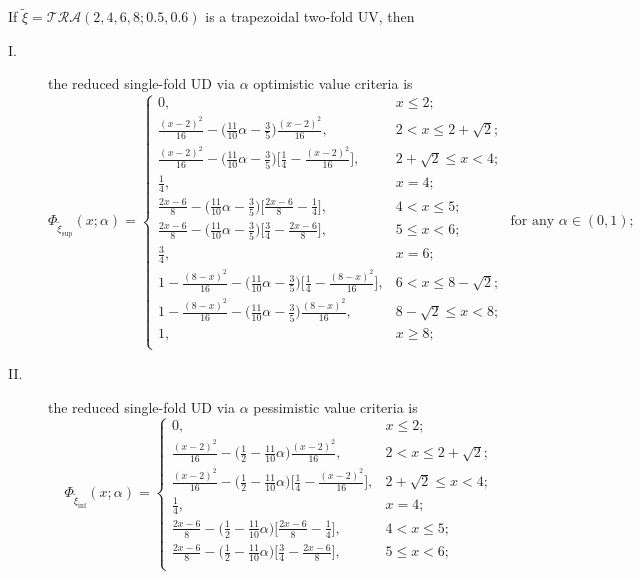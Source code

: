 \begin{example}
	If $\tilde{\xi}=\mathcal{TRA}(2,4,6,8;0.5,0.6)$ is a trapezoidal two-fold UV, then
	\begin{description}
		\item[I.] the reduced single-fold UD via $\alpha$ optimistic value criteria is 
		\[\Phi_{\tilde{\xi}_{\sup}}(x;\alpha)=\left\{
		\begin{array}{ll}
			0, & x\leq 2;\\
			\frac{(x-2)^2}{16}-\big(\frac{11}{10}\alpha-\frac{3}{5}\big)\frac{(x-2)^2}{16}, & 2<x\leq 2+\sqrt{2};\\
			\frac{(x-2)^2}{16}-\big(\frac{11}{10}\alpha-\frac{3}{5}\big)\big[\frac{1}{4}-\frac{(x-2)^2}{16}\big], & 2+\sqrt{2}\leq x<4;\\
			\frac{1}{4}, & x=4;\\
			\frac{2x-6}{8}-\big(\frac{11}{10}\alpha-\frac{3}{5}\big)\big[\frac{2x-6}{8}-\frac{1}{4}\big], & 4<x\leq 5;\\
			\frac{2x-6}{8}-\big(\frac{11}{10}\alpha-\frac{3}{5}\big)\big[\frac{3}{4}-\frac{2x-6}{8}\big], &  5\leq x<6;\\
			\frac{3}{4}, & x=6;\\
			1-\frac{(8-x)^2}{16}-\big(\frac{11}{10}\alpha-\frac{3}{5}\big)\big[\frac{1}{4}-\frac{(8-x)^2}{16}\big], & 6<x\leq 8-\sqrt{2};\\
			1-\frac{(8-x)^2}{16}-\big(\frac{11}{10}\alpha-\frac{3}{5}\big)\frac{(8-x)^2}{16}, &  8-\sqrt{2}\leq x<8;\\
			1, & x\geq 8;\\
		\end{array}
		\right.
		\text{ for any }\alpha \in (0,1);	\]
		\item[II.] the reduced single-fold UD via $\alpha$ pessimistic value criteria is 
		\[\Phi_{\tilde{\xi}_{\inf}}(x;\alpha)=\left\{
		\begin{array}{ll}
			0, & x\leq 2;\\
			\frac{(x-2)^2}{16}-\big(\frac{1}{2}-\frac{11}{10}\alpha\big)\frac{(x-2)^2}{16}, & 2<x\leq 2+\sqrt{2};\\
			\frac{(x-2)^2}{16}-\big(\frac{1}{2}-\frac{11}{10}\alpha\big)\big[\frac{1}{4}-\frac{(x-2)^2}{16}\big], & 2+\sqrt{2}\leq x<4;\\
			\frac{1}{4}, & x=4;\\
			\frac{2x-6}{8}-\big(\frac{1}{2}-\frac{11}{10}\alpha\big)\big[\frac{2x-6}{8}-\frac{1}{4}\big], & 4<x\leq 5;\\
			\frac{2x-6}{8}-\big(\frac{1}{2}-\frac{11}{10}\alpha\big)\big[\frac{3}{4}-\frac{2x-6}{8}\big], &  5\leq x<6;\\

\end{array}\]
\end{description}
\end{example}
